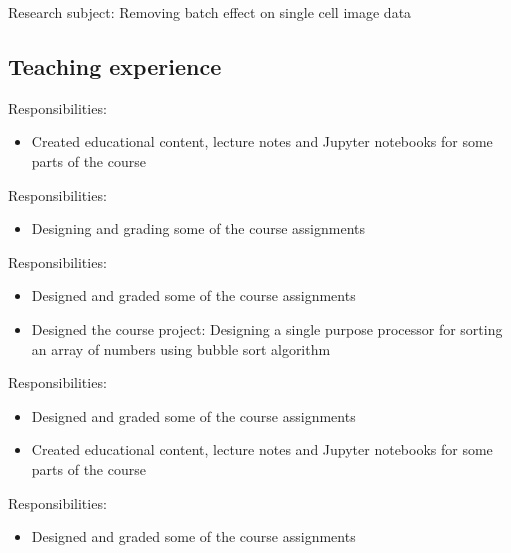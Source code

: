 \documentclass[11pt, a4paper]{moderncv}
\begin{document}
{Research subject: Removing batch effect on single cell image data}

\subsection{\textbf{Teaching experience}}
{
Responsibilities: 
\begin{itemize}
\item Created educational content, lecture notes and Jupyter notebooks for some parts of the course
\end{itemize}
}

{
Responsibilities: 
\begin{itemize}
\item  Designing and grading some of the course assignments
\end{itemize}
}

{
Responsibilities: 
\begin{itemize}
\item  Designed and graded some of the course assignments
\item Designed the course project: Designing a single purpose processor for sorting an array of numbers using bubble sort algorithm
\end{itemize}
}
{
	Responsibilities: 
	\begin{itemize}
	\item  Designed and graded some of the course assignments
	\item Created educational content, lecture notes and Jupyter notebooks for some parts of the course
	\end{itemize}
}

{
Responsibilities: 
\begin{itemize}
\item  Designed and graded some of the course assignments
\end{itemize}
}
\end{document}

